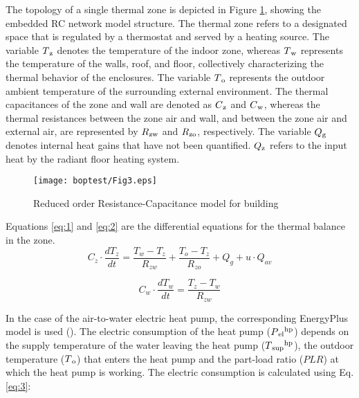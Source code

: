 The topology of a single thermal zone is depicted in Figure \ref{fig:3}, showing the embedded RC network model structure. The thermal zone refers to a designated space that is regulated by a thermostat and served by a heating source. The variable $T\textsubscript{z}$ denotes the temperature of the indoor zone, whereas $T\textsubscript{w}$ represents the temperature of the walls, roof, and floor, collectively characterizing the thermal behavior of the enclosures. The variable $T\textsubscript{o}$ represents the outdoor ambient temperature of the surrounding external environment. The thermal capacitances of the zone and wall are denoted as $C\textsubscript{z}$ and $C\textsubscript{w}$, whereas the thermal resistances between the zone air and wall, and between the zone air and external air, are represented by $R\textsubscript{zw}$ and $R\textsubscript{zo}$, respectively. The variable $Q\textsubscript{g}$ denotes internal heat gains that have not been quantified. $Q\textsubscript{z}$ refers to the input heat by the radiant floor heating system.

\begin{figure}
  \texttt{[image: boptest/Fig3.eps]}
\caption{Reduced order Resistance-Capacitance model for building}
\label{fig:3}       %
\end{figure}
%

Equations \ref{eq:1} and \ref{eq:2} are the differential equations for the thermal balance in the zone.
\begin{equation}
C_z \cdot \frac{dT_z}{dt} = \frac{T_w-T_z}{R_{zw}} + \frac{T_o-T_z}{R_{zo}} + Q_g + u \cdot Q_{av}
\label{eq:1}
\end{equation}

\begin{equation}
C_w \cdot \frac{dT_w}{dt}=\frac{T_z-T_w}{R_{zw}}
\label{eq:2}
\end{equation}

In the case of the air-to-water electric heat pump, the corresponding EnergyPlus model is used (\cite{EnergyPlus}). The electric consumption of the heat pump ($P\textsubscript{el}\textsuperscript{hp}$) depends on the supply temperature of the water leaving the heat pump ($T\textsubscript{sup}\textsuperscript{hp}$), the outdoor temperature ($T\textsubscript{o}$) that enters the heat pump and the part-load ratio ($PLR$) at which the heat pump is working. The electric consumption is calculated using Eq. \ref{eq:3}:

